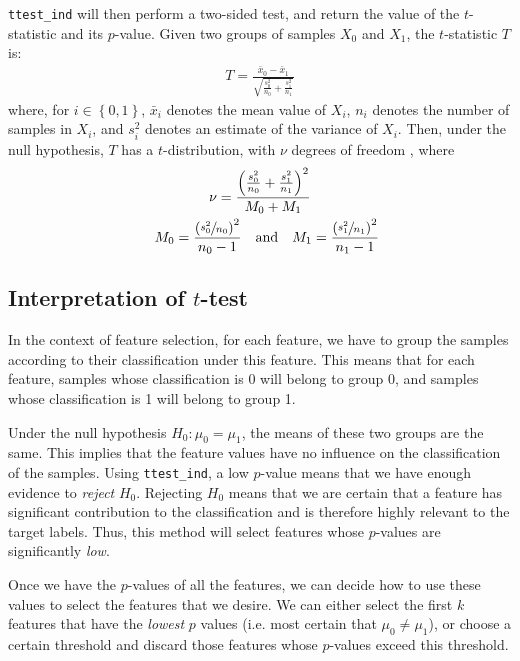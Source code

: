 \documentclass[12pt, twoside, a4paper]{report}
\begin{document}
\texttt{ttest\_ind} will then perform a two-sided test, and return the value of the $t$-statistic and its $p$-value. Given two groups of samples $X_0$ and $X_1$, the $t$-statistic $T$ is:
\begin{align*}
T = \frac{\bar{x}_0 - \bar{x}_1}{\sqrt{\frac{s_0^2}{n_0} + \frac{s_1^2}{n_1}}}
\end{align*}
where, for $i \in \left\lbrace 0,1 \right\rbrace$, $\bar{x}_i$ denotes the mean value of $X_i$, $n_i$ denotes the number of samples in $X_i$, and $s_i^2$ denotes an estimate of the variance of $X_i$. Then, under the null hypothesis, $T$ has a $t$-distribution, with $\nu$ degrees of freedom \cite{RefWorks:219}, where
\begin{gather*}
\nu = \frac{\left( \frac{s_0^2}{n_0} + \frac{s_1^2}{n_1} \right)^2}{ M_0 + M_1 } \\
\quad M_0 = \frac{\left(\sfrac{s_0^2}{n_0}\right)^2}{n_0-1} \quad \text{and} \quad
M_1 = \frac{\left(\sfrac{s_1^2}{n_1}\right)^2}{n_1-1}
\end{gather*}

\subsection{Interpretation of $t$-test}
In the context of feature selection, for each feature, we have to group the samples according to their classification under this feature. This means that for each feature, samples whose classification is 0 will belong to group 0, and samples whose classification is 1 will belong to group 1.

Under the null hypothesis $H_0: \mu_0 = \mu_1$, the means of these two groups are the same. This implies that the feature values have no influence on the classification of the samples. Using \texttt{ttest\_ind}, a low $p$-value means that we have enough evidence to \textit{reject} $H_0$. Rejecting $H_0$ means that we are certain that a feature has significant contribution to the classification and is therefore highly relevant to the target labels. Thus, this method will select features whose $p$-values are significantly \textit{low}.

Once we have the $p$-values of all the features, we can decide how to use these values to select the features that we desire. We can either select the first $k$ features that have the \textit{lowest} $p$ values (i.e. most certain that $\mu_0 \neq \mu_1$), or choose a certain threshold and discard those features whose $p$-values exceed this threshold.
\end{document}
